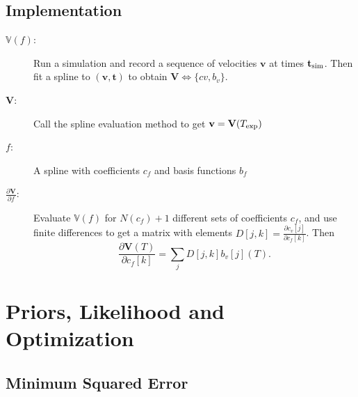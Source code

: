 \documentclass[11pt]{article}
\newcommand{\partiald}[2]{\frac{\partial #1}{\partial #2}}
\newcommand\bv{\mathbf{v}}
\newcommand\bt{\mathbf{t}}
\newcommand\Vfunc{\mathbb{V}}
\newcommand\Vt{\mathbf{V}}
\newcommand\texp{T_{\rm{exp}}}
\newcommand\cf{c_f}
\newcommand\cv{c_v}
\newcommand\fbasis{b_f}
\newcommand\vbasis{b_v}
\newcommand\tsim{{\mathbf t}_{\rm{sim}}}
\newcommand\DVDf{\partiald{\Vt}{f}}
\begin{document}
\subsection{Implementation}
\label{sec:basic_implementation}

\begin{description}
\item[$\Vfunc(f)$:] Run a simulation and record a sequence of
  velocities $\bv$ at times $\tsim$.  Then fit a
  spline to $(\bv, \bt)$ to obtain $\Vt\iff \{cv,\vbasis\}$.
\item[$\Vt$:] Call the spline evaluation method to get $\bv = \Vt(\texp)$
\item[$f$:] A spline with coefficients $\cf$ and basis functions
  $\fbasis$
\item[$\DVDf$:] Evaluate $\Vfunc(f)$ for $N(\cf)+1$ different sets of
  coefficients $\cf$, and use finite differences to get a matrix with
  elements $D[j,k] = \partiald{\cv[j]}{\cf[k]}$.  Then
  \begin{equation*}
    \partiald{\Vt(T)}{\cf[k]} = \sum_j D[j,k] \vbasis[j](T).
  \end{equation*}
\end{description}

\section{Priors, Likelihood and Optimization}
\label{sec:opt}

\subsection{Minimum Squared Error}
\label{sec:minsq}
\end{document}
